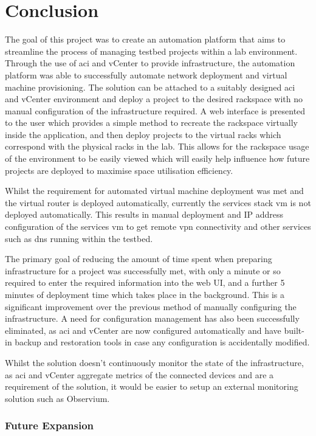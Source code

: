 \chapter{Conclusion}
\label{chap:conclusion}
The goal of this project was to create an automation platform that aims to streamline the process of managing testbed projects within a lab environment. Through the use of \gls{aci} and vCenter to provide infrastructure, the automation platform was able to successfully automate network deployment and virtual machine provisioning. The solution can be attached to a suitably designed \gls{aci} and vCenter environment and deploy a project to the desired rackspace with no manual configuration of the infrastructure required. A web interface is presented to the user which provides a simple method to recreate the rackspace virtually inside the application, and then deploy projects to the virtual racks which correspond with the physical racks in the lab. This allows for the rackspace usage of the environment to be easily viewed which will easily help influence how future projects are deployed to maximise space utilisation efficiency.

Whilst the requirement for automated virtual machine deployment was met and the virtual router is deployed automatically, currently the services stack \gls{vm} is not deployed automatically. This results in manual deployment and IP address configuration of the services \gls{vm} to get remote \gls{vpn} connectivity and other services such as \gls{dns} running within the testbed.

The primary goal of reducing the amount of time spent when preparing infrastructure for a project was successfully met, with only a minute or so required to enter the required information into the web UI, and a further 5 minutes of deployment time which takes place in the background. This is a significant improvement over the previous method of manually configuring the infrastructure. A need for configuration management has also been successfully eliminated, as \gls{aci} and vCenter are now configured automatically and have built-in backup and restoration tools in case any configuration is accidentally modified.

Whilst the solution doesn't continuously monitor the state of the infrastructure, as \gls{aci} and vCenter aggregate metrics of the connected devices and are a requirement of the solution, it would be easier to setup an external monitoring solution such as Observium.

\subsection{Future Expansion}
\label{sec:future-expansion}

